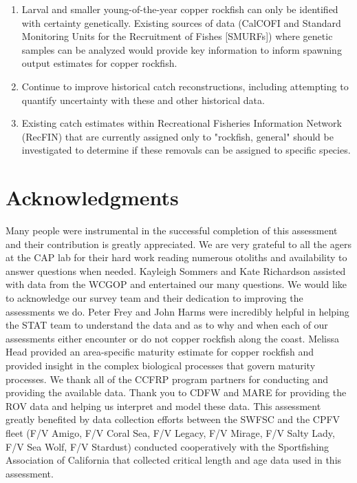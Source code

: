 \documentclass[11pt,
  letterpaper,
]{article}
\begin{document}
\begin{enumerate}
    \item Larval and smaller young-of-the-year copper rockfish can only be identified with certainty genetically. Existing sources of data (CalCOFI and Standard Monitoring Units for the Recruitment of Fishes [SMURFs]) where genetic samples can be analyzed would provide key information to inform spawning output estimates for copper rockfish.
 
    \item Continue to improve historical catch reconstructions, including attempting to quantify uncertainty with these and other historical data.
  
    \item Existing catch estimates within Recreational Fisheries Information Network (RecFIN) that are currently assigned only to "rockfish, general" should be investigated to determine if these removals can be assigned to specific species.

\end{enumerate}

\section{Acknowledgments}\label{acknowledgments}

Many people were instrumental in the successful completion of this assessment and their contribution is greatly appreciated. We are very grateful to all the agers at the CAP lab for their hard work reading numerous otoliths and availability to answer questions when needed. Kayleigh Sommers and Kate Richardson assisted with data from the WCGOP and entertained our many questions. We would like to acknowledge our survey team and their dedication to improving the assessments we do. Peter Frey and John Harms were incredibly helpful in helping the STAT team to understand the data and as to why and when each of our assessments either encounter or do not copper rockfish along the coast. Melissa Head provided an area-specific maturity estimate for copper rockfish and provided insight in the complex biological processes that govern maturity processes. We thank all of the CCFRP program partners for conducting and providing the available data. Thank you to CDFW and MARE for providing the ROV data and helping us interpret and model these data. This assessment greatly benefited by data collection efforts between the SWFSC and the CPFV fleet (F/V Amigo, F/V Coral Sea, F/V Legacy, F/V Mirage, F/V Salty Lady, F/V Sea Wolf, F/V Stardust) conducted cooperatively with the Sportfishing Association of California that collected critical length and age data used in this assessment.
\end{document}
